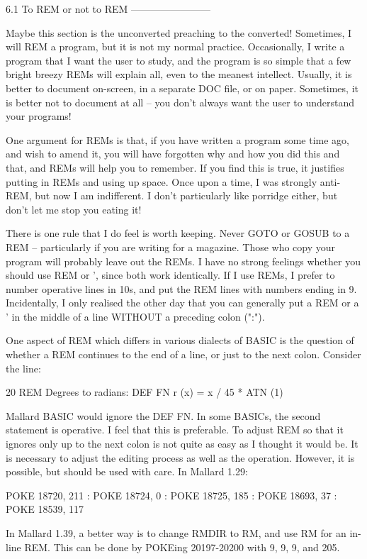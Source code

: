 6.1 To REM or not to REM
------------------------

Maybe this section is the unconverted preaching to the converted! Sometimes, I 
will REM a program, but it is not my normal practice. Occasionally, I write  a 
program that I want the user to study, and the program is so simple that a few 
bright  breezy REMs will explain all, even to the meanest intellect.  Usually, 
it  is  better  to document on-screen, in a separate DOC file,  or  on  paper. 
Sometimes,  it is better not to document at all -- you don't always  want  the 
user to understand your programs!

One  argument for REMs is that, if you have written a program some  time  ago, 
and  wish  to amend it, you will have forgotten why and how you did  this  and 
that,  and  REMs  will  help you to remember. If you find  this  is  true,  it 
justifies putting in REMs and using up space. Once upon a time, I was strongly 
anti-REM, but now I am indifferent. I don't particularly like porridge either, 
but don't let me stop you eating it!

There  is one rule that I do feel is worth keeping. Never GOTO or GOSUB  to  a 
REM  --  particularly if you are writing for a magazine. Those who  copy  your 
program  will probably leave out the REMs. I have no strong  feelings  whether 
you should use REM or ', since both work identically. If I use REMs, I  prefer 
to number operative lines in 10s, and put the REM lines with numbers ending in 
9.  Incidentally, I only realised the other day that you can generally  put  a 
REM or a ' in the middle of a line WITHOUT a preceding colon (":").

One  aspect of REM which differs in various dialects of BASIC is the  question 
of  whether a REM continues to the end of a line, or just to the  next  colon. 
Consider the line:

        20 REM Degrees to radians: DEF FN r (x) = x / 45 * ATN (1)

Mallard BASIC would ignore the DEF FN. In some BASICs, the second statement is 
operative.  I feel that this is preferable. To adjust REM so that  it  ignores 
only up to the next colon is not quite as easy as I thought it would be. It is 
necessary to adjust the editing process as well as the operation. However,  it 
is possible, but should be used with care. In Mallard 1.29:

        POKE  18720, 211 : POKE 18724, 0 : POKE 18725, 185 : POKE 18693, 37  : 
POKE 18539, 117

In Mallard 1.39, a better way is to change RMDIR to RM, and use RM for an  in-
line REM. This can be done by POKEing 20197-20200 with 9, 9, 9, and 205.

